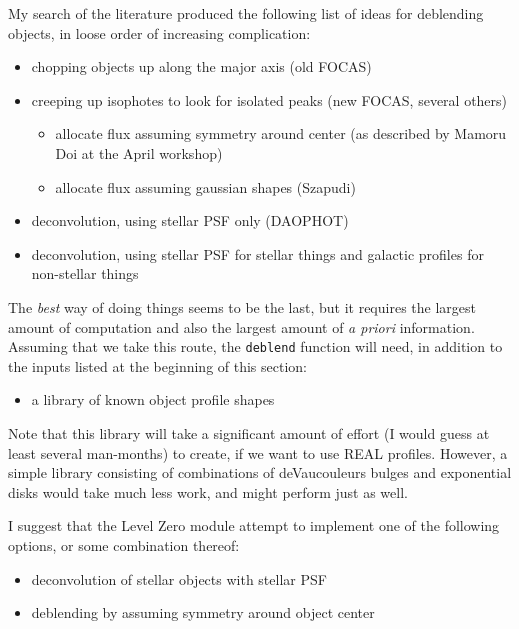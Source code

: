   My search of the literature produced the following list of
ideas for deblending objects, in loose order of increasing
complication:

\begin {itemize}
    \item  chopping objects up along the major axis (old FOCAS)
    \item  creeping up isophotes to look for isolated peaks (new
           FOCAS, several others)
    \begin {itemize}
           \item allocate flux assuming symmetry around center
                 (as described by Mamoru Doi at the April workshop)
           \item allocate flux assuming gaussian shapes (Szapudi)
    \end {itemize}
    \item  deconvolution, using stellar PSF only (DAOPHOT)
    \item  deconvolution, using stellar PSF for stellar things
           and galactic profiles for non-stellar things
\end  {itemize}
             
  The {\it best} way of doing things seems to be the last, but it 
requires the largest amount of computation and also the
largest amount of {\it a priori} information.  Assuming that
we take this route, the {\tt deblend} function will need,
in addition to the inputs listed at the beginning of this section:

\begin {itemize}
  \item a library of known object profile shapes
\end {itemize}

  Note that this library will take a significant amount
of effort (I would guess at least several man-months) to create, if 
we want to use REAL profiles.  However, a simple library consisting
of combinations of deVaucouleurs bulges and exponential disks would
take much less work, and might perform just as well.

  I suggest that the Level Zero module attempt to implement
one of the following options, or some combination thereof:

\begin {itemize}
   \item deconvolution of stellar objects with stellar PSF
   \item deblending by assuming symmetry around object center
\end {itemize}

